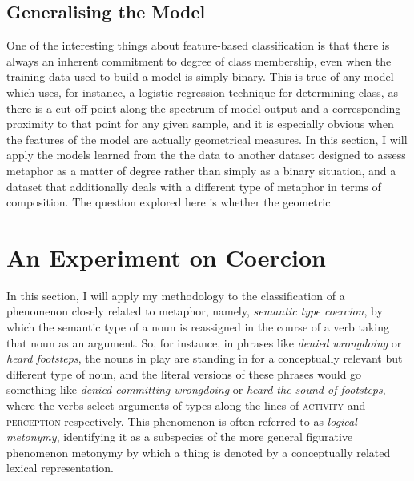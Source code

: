 \subsection{Generalising the Model} \label{sec:genaphor}
One of the interesting things about feature-based classification is that there is always an inherent commitment to degree of class membership, even when the training data used to build a model is simply binary.  This is true of any model which uses, for instance, a logistic regression technique for determining class, as there is a cut-off point along the spectrum of model output and a corresponding proximity to that point for any given sample, and it is especially obvious when the features of the model are actually geometrical measures.  In this section, I will apply the models learned from the the \cite{GutierrezEA2016} data to another dataset designed to assess metaphor as a matter of degree rather than simply as a binary situation, and a dataset that additionally deals with a different type of metaphor in terms of composition.  The question explored here is whether the geometric 

\section{An Experiment on Coercion}
In this section, I will apply my methodology to the classification of a phenomenon closely related to metaphor, namely, \emph{semantic type coercion}, by which the semantic type of a noun is reassigned in the course of a verb taking that noun as an argument.  So, for instance, in phrases like \emph{denied wrongdoing} or \emph{heard footsteps}, the nouns in play are standing in for a conceptually relevant but different type of noun, and the literal versions of these phrases would go something like \emph{denied committing wrongdoing} or \emph{heard the sound of footsteps}, where the verbs select arguments of types along the lines of \textsc{activity} and \textsc{perception} respectively.  This phenomenon is often referred to as \emph{logical metonymy}, identifying it as a subspecies of the more general figurative phenomenon metonymy by which a thing is denoted by a conceptually related lexical representation.

